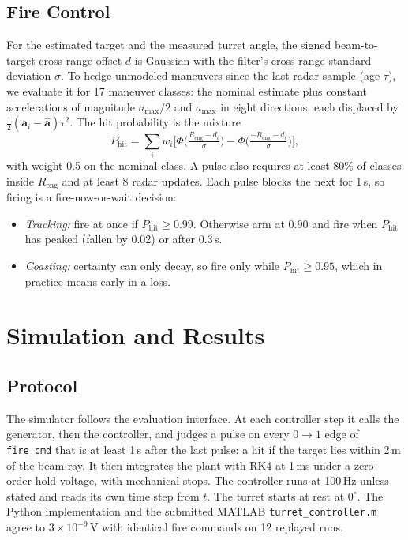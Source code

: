 \documentclass[conference]{IEEEtran}
\newcommand{\Reng}{R_{\mathrm{eng}}}
\begin{document}
\subsection{Fire Control}
\label{sec:fire}
For the estimated target and the measured turret angle, the signed beam-to-target cross-range offset $d$ is Gaussian with the filter's cross-range standard deviation $\sigma$. To hedge unmodeled maneuvers since the last radar sample (age $\tau$), we evaluate it for 17 maneuver classes: the nominal estimate plus constant accelerations of magnitude $a_{\max}/2$ and $a_{\max}$ in eight directions, each displaced by $\tfrac12(\mathbf a_i-\hat{\mathbf a})\tau^2$. The hit probability is the mixture
\begin{equation}
P_{\mathrm{hit}}=\sum_i w_i\Big[\Phi\Big(\tfrac{\Reng-d_i}{\sigma}\Big)-\Phi\Big(\tfrac{-\Reng-d_i}{\sigma}\Big)\Big],
\end{equation}
with weight 0.5 on the nominal class. A pulse also requires at least 80\% of classes inside $\Reng$ and at least 8 radar updates. Each pulse blocks the next for 1\,s, so firing is a fire-now-or-wait decision:
\begin{itemize}
\item \emph{Tracking:} fire at once if $P_{\mathrm{hit}}\ge0.99$. Otherwise arm at $0.90$ and fire when $P_{\mathrm{hit}}$ has peaked (fallen by 0.02) or after 0.3\,s.
\item \emph{Coasting:} certainty can only decay, so fire only while $P_{\mathrm{hit}}\ge0.95$, which in practice means early in a loss.
\end{itemize}

\section{Simulation and Results}
\label{sec:results}

\subsection{Protocol}
The simulator follows the evaluation interface. At each controller step it calls the generator, then the controller, and judges a pulse on every $0\to1$ edge of \texttt{fire\_cmd} that is at least 1\,s after the last pulse: a hit if the target lies within 2\,m of the beam ray. It then integrates the plant with RK4 at 1\,ms under a zero-order-hold voltage, with mechanical stops. The controller runs at 100\,Hz unless stated and reads its own time step from $t$. The turret starts at rest at $0^\circ$. The Python implementation and the submitted MATLAB \texttt{turret\_controller.m} agree to $3\times10^{-9}$\,V with identical fire commands on 12 replayed runs.
\end{document}
